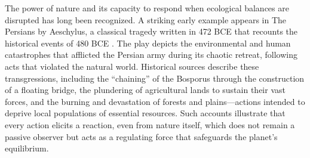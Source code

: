 \documentclass[12pt]{Definitions/academia}
\begin{document}
The power of nature and its capacity to respond when ecological balances
are disrupted has long been recognized. A striking early example appears
in The Persians by Aeschylus, a classical tragedy written in 472 BCE
that recounts the historical events of 480 BCE \textit{\cite{Aeschylus,Aeschylus-1}}.
The play depicts the environmental and human catastrophes that afflicted
the Persian army during its chaotic retreat, following acts that violated
the natural world. Historical sources describe these transgressions,
including the \textquotedblleft chaining\textquotedblright{} of the
Bosporus through the construction of a floating bridge, the plundering
of agricultural lands to sustain their vast forces, and the burning
and devastation of forests and plains---actions intended to deprive
local populations of essential resources. Such accounts illustrate
that every action elicits a reaction, even from nature itself, which
does not remain a passive observer but acts as a regulating force
that safeguards the planet\textquoteright s equilibrium.
\end{document}
